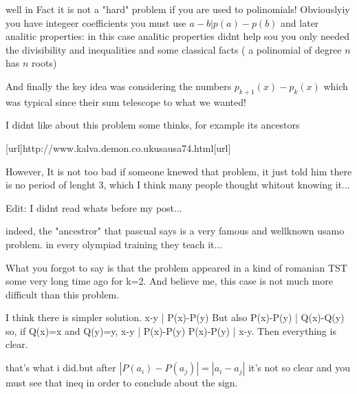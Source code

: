 \begin{solution}
	well in Fact it is not a "hard" problem if you are used to polinomials! Obviouslyiy you have integeer coefficients you must use $a-b|p(a)-p(b)$ and later analitic properties: in this case analitic properties didnt help sou you only needed the divisibility and inequalities and some classical facts ( a polinomial of degree $n$ has $n$ roots)

And finally the key idea was considering the numbers $p_{k+1}(x)-p_{k}(x)$ which was typical since their sum telescope to what we wanted!

I didnt like about this problem some thinks, for example its ancestors

[url]http://www.kalva.demon.co.uk\/usa\/usa74.html[\/url]

However, It  is not too bad if someone knewed that problem, it just told him there is no period of lenght 3, which I think many people thought whitout knowing it...

Edit: I didnt read whats before my post... 
\end{solution}



\begin{solution}
	indeed, the "ancestror" that pascual says is a very famous and wellknown usamo problem.
in every olympiad training they teach it...
\end{solution}



\begin{solution}
	What you forgot to say is that the problem appeared in a kind of romanian TST some very long time ago for k=2. And believe me, this case is not much more difficult than this problem.
\end{solution}



\begin{solution}
	I think there is simpler solution.
x-y | P(x)-P(y)
But also P(x)-P(y) | Q(x)-Q(y)
so, if Q(x)=x and Q(y)=y,
x-y | P(x)-P(y)
P(x)-P(y) | x-y. Then everything is clear.
\end{solution}



\begin{solution}
	that's what i did.but after $|P(a_{i})-P(a_{j})|=|a_{i}-a_{j}|$ it's not so clear and you must see that ineq in order to conclude about the sign. 
\end{solution}



